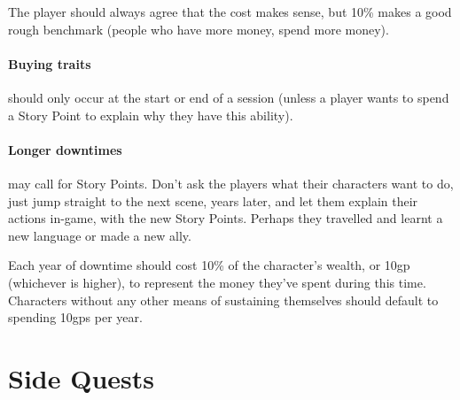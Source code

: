 \begin{multicols}{2}
The player should always agree that the cost makes sense, but 10\% makes a good rough benchmark (people who have more money, spend more money).

\paragraph{Buying traits}
should only occur at the start or end of a session (unless a player wants to spend a Story Point to explain why they have this ability).


\paragraph{Longer downtimes}
may call for Story Points.
Don't ask the players what their characters want to do, just jump straight to the next scene, years later, and let them explain their actions in-game, with the new Story Points.
Perhaps they travelled and learnt a new language or made a new ally.

Each year of downtime should cost 10\% of the character's wealth, or 10\gls{gp} (whichever is higher), to represent the money they've spent during this time.
Characters without any other means of sustaining themselves should default to spending 10\glspl{gp} per year.

\end{multicols}

\section{Side Quests}\label{sidequests}

